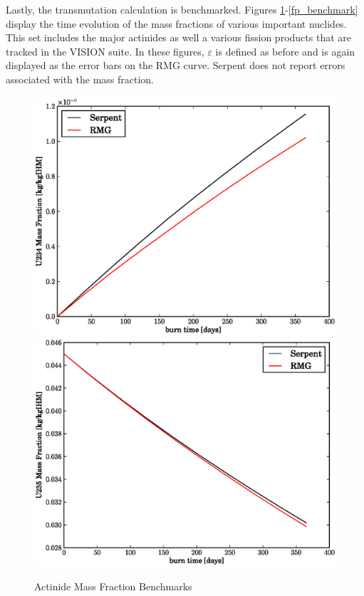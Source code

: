 Lastly, the transmutation calculation is benchmarked.
Figures \ref{act_benchmark}-\ref{fp_benchmark} display the time evolution of the mass 
fractions of various important nuclides. This set includes the major actinides 
as well a various fission products that are tracked in the VISION suite.  
In these figures, $\varepsilon$ is defined as before and is again displayed as the error bars on 
the RMG curve.   Serpent does not report errors associated with the mass fraction.

\begin{figure}[htbp]
\caption{Actinide Mass Fraction Benchmarks}
\label{act_benchmark}
\begin{center}
\includegraphics[scale=0.3]{multigroup_method/figs/benchmark/U234_Mass_Fraction_.eps}
\includegraphics[scale=0.3]{multigroup_method/figs/benchmark/U235_Mass_Fraction_.eps}

\end{center}
\end{figure}
